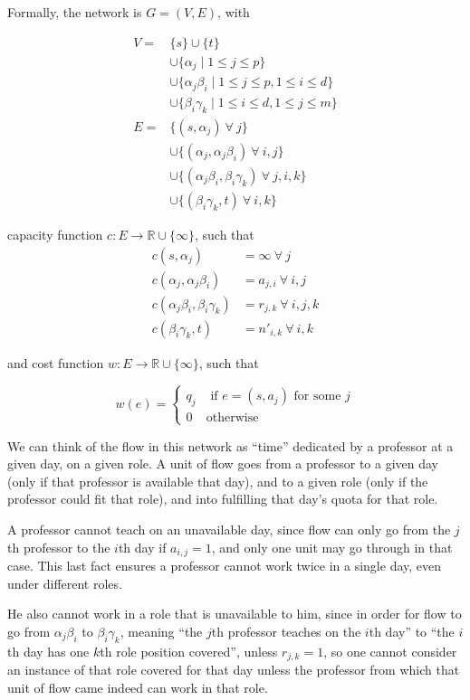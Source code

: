 Formally, the network is $G = (V, E)$, with

\begin{align*}
V = &\{s\} \cup \{t\}\\
&\cup \{\alpha_j \mid 1 \le j \le p\}\\
&\cup \{\alpha_j \beta_i \mid 1 \le j \le p, 1 \le i \le d\}\\
&\cup \{\beta_i \gamma_k \mid 1 \le i \le d, 1 \le j \le m\}\\
E = &\{(s, \alpha_j)\ \forall\ j\}\\
    &\cup \{(\alpha_j, \alpha_j \beta_i)\ \forall\ i, j \}\\
    &\cup \{(\alpha_j \beta_i, \beta_i \gamma_k)\ \forall\ j, i, k\}\\
    &\cup \{(\beta_i \gamma_k, t)\ \forall\ i, k \}
\end{align*}

capacity function $c:E \to \mathbb{R} \cup \{\infty\}$, such that
\begin{align*}
c(s, \alpha_j) &= \infty\ \forall\ j\\
c(\alpha_j, \alpha_j \beta_i) &= a_{j, i}\ \forall\ i, j\\
c(\alpha_j \beta_i, \beta_i \gamma_k) &= r_{j, k}\ \forall\ i, j, k\\
c(\beta_i \gamma_k, t) &= n'_{i, k}\ \forall\ i, k
\end{align*}

and cost function $w:E \to \mathbb{R} \cup \{\infty\}$, such that

$$
w(e) =
\begin{cases}
q_j &\text{ if } e = (s, a_j) \text{ for some }j\\
0 & \text{otherwise}
\end{cases}
$$

We can think of the flow in this network as ``time'' dedicated by a professor at a given day, on a given role. A unit of flow goes from a professor to a given day (only if that professor is available that day), and to a given role (only if the professor could fit that role), and into fulfilling that day's quota for that role.

A professor cannot teach on an unavailable day, since flow can only go from the $j$th professor to the $i$th day if $a_{i, j} = 1$, and only one unit may go through in that case. This last fact ensures a professor cannot work twice in a single day, even under different roles.

He also cannot work in a role that is unavailable to him, since in order for flow to go from $\alpha_j \beta_i$ to $\beta_i \gamma_k$, meaning ``the $j$th professor teaches on the $i$th day'' to ``the $i$th day has one $k$th role position covered'', unless $r_{j, k} = 1$, so one cannot consider an instance of that role covered for that day unless the professor from which that unit of flow came indeed can work in that role.

